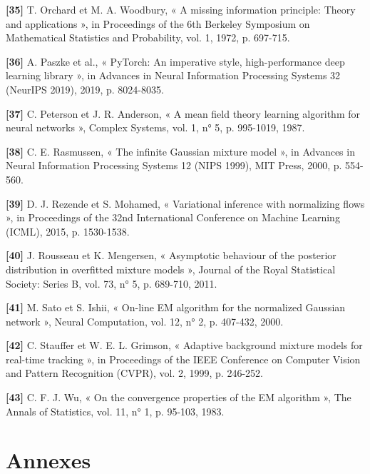 \textbf{[35]  }T. Orchard et M. A. Woodbury, « A missing information principle: Theory and applications », in Proceedings of the 6th Berkeley Symposium on Mathematical Statistics and Probability, vol. 1, 1972, p. 697-715.

\textbf{[36]  }A. Paszke et al., « PyTorch: An imperative style, high-performance deep learning library », in Advances in Neural Information Processing Systems 32 (NeurIPS 2019), 2019, p. 8024-8035.

\textbf{[37]  }C. Peterson et J. R. Anderson, « A mean field theory learning algorithm for neural networks », Complex Systems, vol. 1, n° 5, p. 995-1019, 1987.

\textbf{[38]  }C. E. Rasmussen, « The infinite Gaussian mixture model », in Advances in Neural Information Processing Systems 12 (NIPS 1999), MIT Press, 2000, p. 554-560.

\textbf{[39]  }D. J. Rezende et S. Mohamed, « Variational inference with normalizing flows », in Proceedings of the 32nd International Conference on Machine Learning (ICML), 2015, p. 1530-1538.

\textbf{[40]  }J. Rousseau et K. Mengersen, « Asymptotic behaviour of the posterior distribution in overfitted mixture models », Journal of the Royal Statistical Society: Series B, vol. 73, n° 5, p. 689-710, 2011.

\textbf{[41]  }M. Sato et S. Ishii, « On-line EM algorithm for the normalized Gaussian network », Neural Computation, vol. 12, n° 2, p. 407-432, 2000.

\textbf{[42]  }C. Stauffer et W. E. L. Grimson, « Adaptive background mixture models for real-time tracking », in Proceedings of the IEEE Conference on Computer Vision and Pattern Recognition (CVPR), vol. 2, 1999, p. 246-252.

\textbf{[43]  }C. F. J. Wu, « On the convergence properties of the EM algorithm », The Annals of Statistics, vol. 11, n° 1, p. 95-103, 1983.


\chapter*{Annexes}
